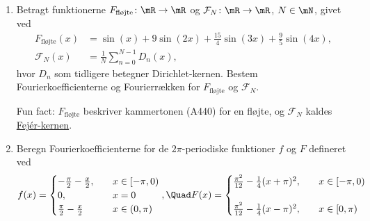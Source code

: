 \begin{opg}[Fourierrækker II]\hfill
\begin{enumerate}
	\item Betragt funktionerne $F_{\text{fløjte}}\colon \mR \to \mR$ og $\mathcal{F}_N\colon \mR \to \mR$, $N \in \mN$, givet ved 
	\begin{align*}
	    F_{\text{fløjte}}(x) &= \sin(x) + 9 \sin(2x) + \frac{15}{4} \sin(3x)
	        + \frac{9}{5} \sin(4x), \\
	    \mathcal F_N(x) &= \frac{1}{N} \sum_{n=0}^{N-1} D_n(x),
	\end{align*}
	hvor $D_n$ som tidligere betegner Dirichlet-kernen. Bestem Fourierkoefficienterne og Fourierrækken for $F_{\text{fløjte}}$ og $\mathcal{F}_N$. 
	
	Fun fact: $F_{\text{fløjte}}$ beskriver kammertonen (A440) for en fløjte,
	og $\mathcal{F}_N$ kaldes \href{https://en.wikipedia.org/wiki/Fejer_kernel}{Fej\'er-kernen}.
	
	\iffalse\begin{proof}[Løsning]
	Bemærk indledningsvis
	\begin{align*}
	    F_{\text{fløjte}}\pare{x}
            &=\sin(x)+9\sin(2x)+\frac{15}{4}\sin(3x)+\frac{9}{5} \sin(4x) \\
            &= \frac{1}{i2}\pare{-\frac{9}{5}e^{-i4x} - \frac{15}{4}e^{-i3x}
                - 9e^{-i2x} - e^{-ix} + e^{ix} + 9e^{i2x} + \frac{15}{4}e^{i3x}
                + \frac{9}{5}e^{i4x}},
	\end{align*}
	hvilket er Fourierrækken for $F_{\text{fljøte}}$ som følge af MC 5.21. 
	
	Bemærk nu
	\begin{align*}
	    \cF_N\pare{x} &= \frac{1}{N} \sum_{n=0}^{N-1} D_n(x) \\
	        &= \frac{1}{N}\pare{
	            e^{-i\pare{N-1}x}+2e^{-i\pare{N-2}x}+\ldots+\pare{N-1} e^{-ix} + N +  \pare{N-1} e^{ix} + \ldots + 2e^{i\pare{N-2}x}
	            + e^{-i\pare{N-1}x}},
	\end{align*}
	hvilket er Fourierrækken for $\cF_N$ som følge af MC 5.21.
	\end{proof}\fi
	
	\item Beregn Fourierkoefficienterne for de $2\pi$-periodiske funktioner $f$ og $F$ defineret ved
	$$ f(x) = \begin{cases}
	    - \frac{\pi}{2} - \frac{x}{2}, &\quad x\in[-\pi,0) \\
	    0, &\quad x=0 \\
	    \frac{\pi}{2} - \frac{x}{2} &\quad x\in(0,\pi)
	\end{cases}, \Quad
	F(x) = \begin{cases}
	    \frac{\pi^2}{12}- \frac{1}{4} (x +\pi)^2, &\quad x\in[-\pi,0) \\ \\
    	\frac{\pi^2}{12}- \frac{1}{4} (x -\pi)^2, &\quad x\in[0,\pi)
	\end{cases} $$
	

\end{enumerate}
\end{opg}
